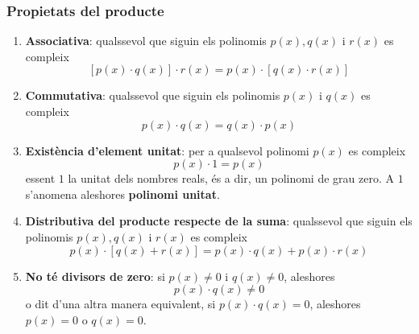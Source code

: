 \subsubsection{Propietats del producte}

\begin{enumerate}
\item[(1)] \textbf{Associativa}: qualssevol que siguin els polinomis $p(x),q(x)$ i $r(x)$ es compleix\begin{equation*}
\left[ p(x)\cdot q(x)\right] \cdot r(x)=p(x)\cdot \left[ q(x)\cdot r(x)\right]
\end{equation*}

\item[(2)] \textbf{Commutativa}: qualssevol que siguin els polinomis $p(x)$
i $q(x)$ es compleix\begin{equation*}
p(x)\cdot q(x)=q(x)\cdot p(x)
\end{equation*}

\item[(3)] \textbf{Existència d'element unitat}: per a qualsevol polinomi $p(x)$ es compleix\begin{equation*}
p(x)\cdot 1=p(x)
\end{equation*}essent $1$ la unitat dels nombres reals, és a dir, un polinomi de
grau zero. A $1$ s'anomena aleshores \textbf{polinomi unitat}.

\item[(4)] \textbf{Distributiva del producte respecte de la suma}:
qualssevol que siguin els polinomis $p(x),q(x)$ i $r(x)$ es compleix\begin{equation*}
p(x)\cdot \left[ q(x)+r(x)\right] =p(x)\cdot q(x)+p(x)\cdot r(x)
\end{equation*}

\item[(5)] \textbf{No té divisors de zero}: si $p(x)\neq 0$ i $q(x)\neq
0 $, aleshores\begin{equation*}
p(x)\cdot q(x)\neq 0
\end{equation*}o dit d'una altra manera equivalent, si $p(x)\cdot q(x)=0$, aleshores $p(x)=0$
o $q(x)=0$.


\end{enumerate}
